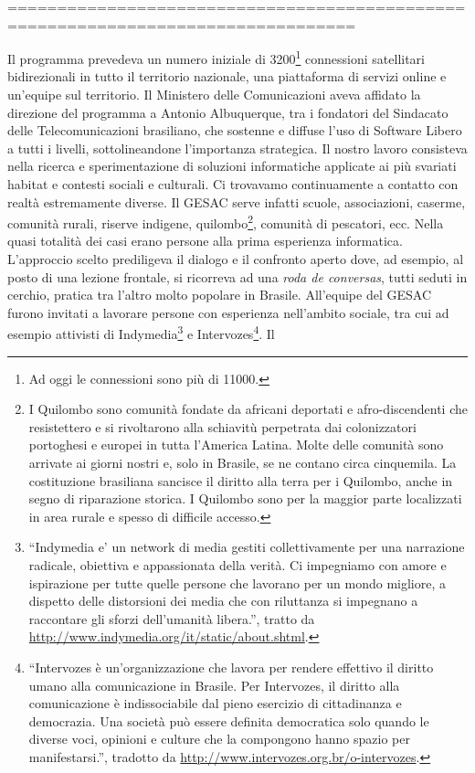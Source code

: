 =================================================================================





Il programma prevedeva un
  numero iniziale di 3200\footnote{Ad oggi le connessioni sono più di
    11000.} connessioni satellitari bidirezionali in tutto il
  territorio nazionale, una piattaforma di servizi online e un'equipe
  sul territorio. Il Ministero delle Comunicazioni aveva affidato la
  direzione del programma a Antonio Albuquerque, tra i fondatori del
  Sindacato delle Telecomunicazioni brasiliano, che sostenne e diffuse
  l'uso di Software Libero a tutti i livelli, sottolineandone
  l'importanza strategica. Il nostro lavoro consisteva nella ricerca e
  sperimentazione di soluzioni informatiche applicate ai più svariati
  habitat e contesti sociali e culturali. Ci trovavamo continuamente a
  contatto con realtà estremamente diverse. Il GESAC serve infatti
  scuole, associazioni, caserme, comunità rurali, riserve indigene,
  quilombo\footnote{I Quilombo sono comunità fondate da africani
    deportati e afro-discendenti che resistettero e si rivoltarono
    alla schiavitù perpetrata dai colonizzatori portoghesi e europei
    in tutta l'America Latina. Molte delle comunità sono arrivate ai
    giorni nostri e, solo in Brasile, se ne contano circa
    cinquemila. La costituzione brasiliana sancisce il diritto alla
    terra per i Quilombo, anche in segno di riparazione storica. I
    Quilombo sono per la maggior parte localizzati in area rurale e
    spesso di difficile accesso.}, comunità di pescatori, ecc. Nella
  quasi totalità dei casi erano persone alla prima esperienza
  informatica. L'approccio scelto prediligeva il dialogo e il
  confronto aperto dove, ad esempio, al posto di una lezione frontale,
  si ricorreva ad una \emph{roda de conversas}, tutti seduti in
  cerchio, pratica tra l'altro molto popolare in Brasile. All'equipe
  del GESAC furono invitati a lavorare persone con esperienza
  nell'ambito sociale, tra cui ad esempio attivisti di
  Indymedia\footnote{``Indymedia e' un network di media gestiti
    collettivamente per una narrazione radicale, obiettiva e
    appassionata della verità. Ci impegniamo con amore e ispirazione
    per tutte quelle persone che lavorano per un mondo migliore, a
    dispetto delle distorsioni dei media che con riluttanza si
    impegnano a raccontare gli sforzi dell'umanità libera.'', tratto
    da \url{http://www.indymedia.org/it/static/about.shtml}.} e
  Intervozes\footnote{``Intervozes è un'organizzazione che lavora per
    rendere effettivo il diritto umano alla comunicazione in Brasile.
    Per Intervozes, il diritto alla comunicazione è indissociabile dal
    pieno esercizio di cittadinanza e democrazia. Una società può
    essere definita democratica solo quando le diverse voci, opinioni
    e culture che la compongono hanno spazio per manifestarsi.'',
    tradotto da \url{http://www.intervozes.org.br/o-intervozes}.}. Il
